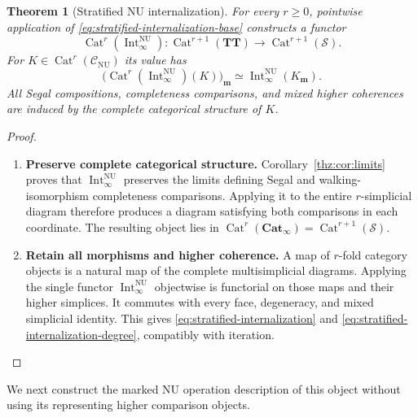 \documentclass[oneside]{article}
\theoremstyle{plain}
\newtheorem{theorem}{Theorem}[section]
\theoremstyle{definition}
\theoremstyle{remark}
\newcommand{\CNU}{\mathcal C_{\mathrm{NU}}}
\newcommand{\Cat}{\mathbf{Cat}_{\infty}}
\newcommand{\Int}{\operatorname{Int}}
\newcommand{\NU}{\mathrm{NU}}
\newcommand{\Sps}{\mathcal S}
\newcommand{\TT}{\mathbf{TT}}
\begin{document}
\begin{theorem}[Stratified NU internalization]
\label{thm:stratified-internalization}
For every $r\geq0$, pointwise application of
\eqref{eq:stratified-internalization-base} constructs a functor
\begin{equation}\label{eq:stratified-internalization}
 \operatorname{Cat}^r(\Int^{\NU}_\infty):
 \operatorname{Cat}^{r+1}(\TT)
 \longrightarrow\operatorname{Cat}^{r+1}(\Sps).
\end{equation}
For $K\in\operatorname{Cat}^r(\CNU)$ its value has
\begin{equation}\label{eq:stratified-internalization-degree}
 \bigl(\operatorname{Cat}^r(\Int^{\NU}_\infty)(K)\bigr)_{\mathbf m}
 \simeq\Int^{\NU}_\infty(K_{\mathbf m}).
\end{equation}
All Segal compositions, completeness comparisons, and mixed higher
coherences are induced by the complete categorical structure of $K$.
\end{theorem}
\begin{proof}
\leavevmode
\begin{enumerate}
\item \textbf{Preserve complete categorical structure.}
Corollary~\ref{thz:cor:limits} proves that
$\Int^{\NU}_\infty$ preserves the limits defining Segal and
walking-isomorphism completeness comparisons.  Applying it to the
entire $r$-simplicial diagram therefore produces a diagram satisfying
both comparisons in each coordinate.  The resulting object lies in
$\operatorname{Cat}^r(\Cat)
 =\operatorname{Cat}^{r+1}(\Sps)$.
\item \textbf{Retain all morphisms and higher coherence.}
A map of $r$-fold category objects is a natural map of the complete
multisimplicial diagrams.  Applying the single functor
$\Int^{\NU}_\infty$ objectwise is functorial on those maps and their
higher simplices.  It commutes with every face, degeneracy, and mixed
simplicial identity.  This gives \eqref{eq:stratified-internalization}
and \eqref{eq:stratified-internalization-degree}, compatibly with
iteration.\qedhere
\end{enumerate}
\end{proof}

We next construct the marked NU operation description of this object
without using its representing higher comparison objects.
\end{document}
